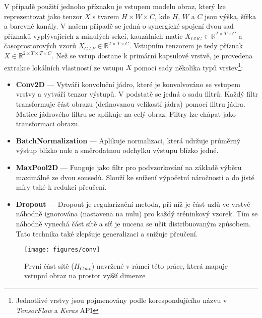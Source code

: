 V případě použití jednoho příznaku je vstupem modelu obraz, který lze
reprezentovat jako tenzor $X$ s tvarem $H \times W \times C$, kde $H$, $W$ a $C$
jsou výška, šířka a barevné kanály. V našem případě se jedná o synergické
spojení dvou sad příznaků vyplývajících z minulých sekcí, kauzálních matic
$X_{COG} \in \mathbb{R}^{T \times T \times C}$ a časoprostorových vzorů $X_{GAF}
\in \mathbb{R}^{T \times T \times C}$. Vstupním tenzorem je tedy příznak $X \in
\mathbb{R}^{2 \times T \times T \times C}$. Než se vstup dostane k primární
kapsulové vrstvě, je provedena extrakce lokálních vlastností ze vstupu $X$
pomocí sady několika typů vrstev\footnote{Jednotlivé vrstvy jsou pojmenovány
podle korespondujícího názvu v \textit{TensorFlow} a \textit{Keras} API}:
\begin{itemize}
    \item \textbf{Conv2D} --- Vytváří konvoluční jádro, které je konvolvováno se
          vstupem vrstvy a vytváří tenzor výstupů. V podstatě se jedná o sadu
          filtrů. Každý filtr transformuje část obrazu (definovanou velikostí
          jádra) pomocí filtru jádra. Matice jádrového filtru se aplikuje na
          celý obraz. Filtry lze chápat jako transformaci obrazu.
    \item \textbf{BatchNormalization} --- Aplikuje normalizaci, která udržuje
          průměrný výstup blízko nule a směrodatnou odchylku výstupu blízko
          jedné.
    \item \textbf{MaxPool2D} --- Funguje jako filtr pro podvzorkování na základě
          výběru maximálně ze dvou sousedů. Slouží ke snížení výpočetní
          náročnosti a do jisté míry také k redukci přeučení.
    \item \textbf{Dropout} --- Dropout je regularizační metoda, při níž je část
          uzlů ve vrstvě náhodně ignorována (nastavena na nulu) pro každý
          tréninkový vzorek. Tím se náhodně vynechá část sítě a síť je nucena se
          učit distribuovaným způsobem. Tato technika také zlepšuje generalizaci
          a snižuje přeučení.
\end{itemize}

\begin{figure}[!htb]
    \begin{center}
        \texttt{[image: figures/conv]}
        \caption{První část sítě ($H_{Conv}$) navržené v rámci této práce, která
            mapuje vstupní obraz na prostor vyšší dimenze}
        \label{fig:conv}
    \end{center}
\end{figure}

